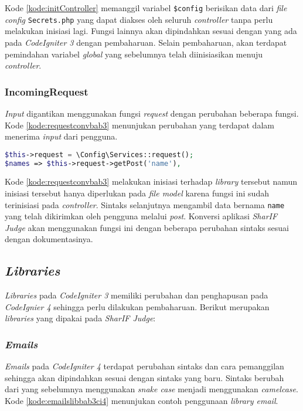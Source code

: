 Kode \ref{kode:initController} memanggil variabel \verb|$config| berisikan data dari \textit{file config} \texttt{Secrets.php} yang dapat diakses oleh seluruh \textit{controller} tanpa perlu melakukan inisiasi lagi. Fungsi lainnya akan dipindahkan sesuai dengan yang ada pada \textit{CodeIgniter 3} dengan pembaharuan. Selain pembaharuan, akan terdapat pemindahan variabel \textit{global} yang sebelumnya telah diinisiasikan menuju \textit{controller}.

\subsubsection{IncomingRequest}
\textit{Input} digantikan menggunakan fungsi \textit{request} dengan perubahan beberapa fungsi. Kode \ref{kode:requestconvbab3} menunjukan perubahan yang terdapat dalam menerima \textit{input} dari pengguna.

\begin{lstlisting}[language=PHP, caption=Contoh perubahan \textit{library request}, label=kode:requestconvbab3]
$this->request = \Config\Services::request(); 
$names => $this->request->getPost('name'),
\end{lstlisting}

Kode \ref{kode:requestconvbab3} melakukan inisiasi terhadap \textit{library} tersebut namun inisiasi tersebut hanya diperlukan pada \textit{file model} karena fungsi ini sudah terinisiasi pada \textit{controller}. Sintaks selanjutnya mengambil data bernama \texttt{name} yang telah dikirimkan oleh pengguna melalui \textit{post}. Konversi aplikasi \textit{SharIF Judge} akan menggunakan fungsi ini dengan beberapa perubahan sintaks sesuai dengan dokumentasinya.

\subsection{\textit{Libraries}}
\textit{Libraries} pada \textit{CodeIgniter 3} memiliki perubahan dan penghapusan pada \textit{CodeIgnier 4} sehingga perlu dilakukan pembaharuan. Berikut merupakan \textit{libraries} yang dipakai pada \textit{SharIF Judge}:

\subsubsection{\textit{Emails}}
\textit{Emails} pada \textit{CodeIgniter 4} terdapat perubahan sintaks dan cara pemanggilan sehingga akan dipindahkan sesuai dengan sintaks yang baru. Sintaks berubah dari yang sebelumnya menggunakan \textit{snake case} menjadi menggunakan \textit{camelcase}. Kode \ref{kode:emailslibbab3ci4} menunjukan contoh penggunaan \textit{library email}.

